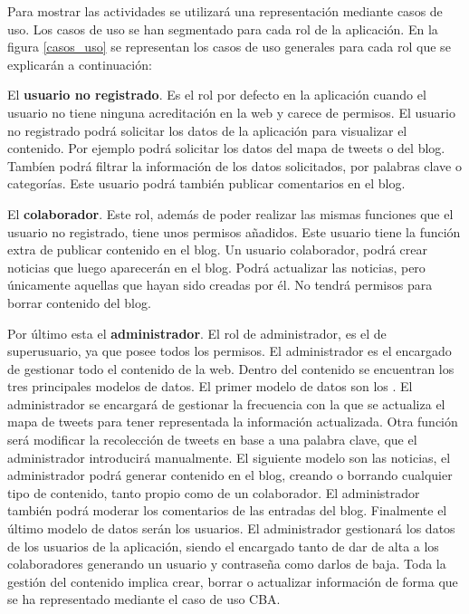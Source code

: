 Para mostrar las actividades se utilizará una representación mediante casos de uso. Los casos de uso se han segmentado para cada rol de la aplicación. En la figura \ref{casos_uso}  se representan los casos de uso generales para cada rol que se explicarán a continuación:

\vspace{5 mm}

El \textbf{usuario no registrado}. Es el rol por defecto en la aplicación cuando el usuario no tiene ninguna acreditación en la web y carece de permisos. El usuario no registrado podrá solicitar los datos de la aplicación para visualizar el contenido. Por ejemplo podrá solicitar los datos del mapa de tweets o del blog. Tambíen podrá filtrar la información de los datos solicitados, por palabras clave o categorías. Este usuario podrá también publicar comentarios en el blog.

\vspace{5 mm}

El \textbf{colaborador}. Este rol, además de poder realizar las mismas funciones que el usuario no registrado, tiene unos permisos añadidos. Este usuario tiene la función extra de publicar contenido en el blog. Un usuario colaborador, podrá crear noticias que luego aparecerán en el blog. Podrá actualizar las noticias, pero únicamente aquellas que hayan sido creadas por él. No tendrá permisos para borrar contenido del blog.

\vspace{5 mm}

Por último esta el \textbf{administrador}. El rol de administrador, es el de superusuario, ya que posee todos los permisos. El administrador es el encargado de gestionar todo el contenido de la web. Dentro del contenido se encuentran los tres principales modelos de datos. El primer modelo de datos son los . El administrador se encargará de gestionar la frecuencia con la que se actualiza el mapa de tweets para tener representada la información actualizada. Otra función será modificar la recolección de tweets en base a una palabra clave, que el administrador introducirá manualmente. El siguiente modelo son las noticias, el administrador podrá generar contenido en el blog, creando o borrando cualquier tipo de contenido, tanto propio como de un colaborador. El administrador también podrá moderar los comentarios de las entradas del blog. Finalmente el último modelo de datos serán los usuarios. El administrador gestionará los datos de los usuarios de la aplicación, siendo el encargado tanto de dar de alta a los colaboradores generando un usuario y contraseña como darlos de baja. Toda la gestión del contenido implica crear, borrar o actualizar información de forma que se ha representado mediante el caso de uso CBA.


